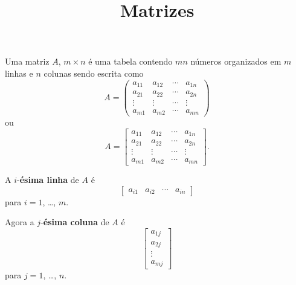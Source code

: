 \documentclass{beamer}
\title{Matrizes}
\author[\autor]{\autor}
\date{}
\begin{document}
    \begin{frame}
        \maketitle
    \end{frame}


    \begin{frame}

      \begin{definicao}
        Uma matriz $A$, $m \times n$ é uma tabela contendo $mn$ números organizados em $m$ linhas e $n$ colunas sendo escrita como
        \begin{displaymath}
         A = \begin{pmatrix}
           a_{11} & a_{12} & \cdots & a_{1n}\\
           a_{21} & a_{22} & \cdots & a_{2n}\\
           \vdots & \vdots & \cdots & \vdots\\
           a_{m1} & a_{m2} & \cdots & a_{mn}
         \end{pmatrix}\end{displaymath}
         ou
        \begin{displaymath}
          A = \begin{bmatrix}
            a_{11} & a_{12} & \cdots & a_{1n}\\
            a_{21} & a_{22} & \cdots & a_{2n}\\
            \vdots & \vdots & \cdots & \vdots\\
            a_{m1} & a_{m2} & \cdots & a_{mn}
          \end{bmatrix}.
        \end{displaymath}
        
      \end{definicao}
    \end{frame}

    \begin{frame}
      A $i$-\textbf{ésima linha} de $A$ é
      \[
        \begin{bmatrix} a_{i1} & a_{i2} & \cdots & a_{in} \end{bmatrix}
      \]
      para $i = 1$, \dots, $m$.

      Agora a $j$-\textbf{ésima coluna} de $A$ é
      \[
        \begin{bmatrix}
          a_{1j}\\
          a_{2j}\\
          \vdots\\
          a_{mj}
        \end{bmatrix}
      \]
      para $j=1$, \dots, $n$.
    \end{frame}
\end{document}
